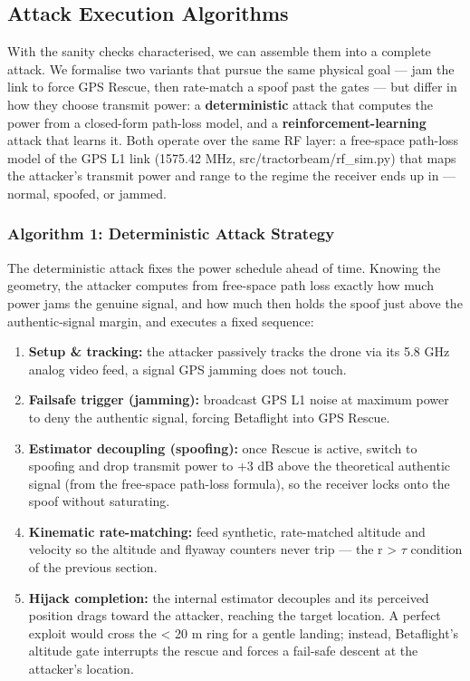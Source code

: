 \documentclass[11pt]{article}
\begin{document}
\subsection*{Attack Execution Algorithms}
With the sanity checks characterised, we can assemble them into a complete attack. We formalise two variants that pursue the same physical goal — jam the link to force GPS Rescue, then rate-match a spoof past the gates — but differ in how they choose transmit power: a \textbf{deterministic} attack that computes the power from a closed-form path-loss model, and a \textbf{reinforcement-learning} attack that learns it. Both operate over the same RF layer: a free-space path-loss model of the GPS L1 link (1575.42 MHz, src/tractorbeam/rf\_\allowbreak{}sim.py) that maps the attacker's transmit power and range to the regime the receiver ends up in — normal, spoofed, or jammed.

\subsubsection*{Algorithm 1: Deterministic Attack Strategy}
The deterministic attack fixes the power schedule ahead of time. Knowing the geometry, the attacker computes from free-space path loss exactly how much power jams the genuine signal, and how much then holds the spoof just above the authentic-signal margin, and executes a fixed sequence:
\begin{enumerate}
\item \textbf{Setup \& tracking:} the attacker passively tracks the drone via its 5.8 GHz analog video feed, a signal GPS jamming does not touch.
\item \textbf{Failsafe trigger (jamming):} broadcast GPS L1 noise at maximum power to deny the authentic signal, forcing Betaflight into GPS Rescue.
\item \textbf{Estimator decoupling (spoofing):} once Rescue is active, switch to spoofing and drop transmit power to +3 dB above the theoretical authentic signal (from the free-space path-loss formula), so the receiver locks onto the spoof without saturating.
\item \textbf{Kinematic rate-matching:} feed synthetic, rate-matched altitude and velocity so the altitude and flyaway counters never trip — the r > $\tau$ condition of the previous section.
\item \textbf{Hijack completion:} the internal estimator decouples and its perceived position drags toward the attacker, reaching the target location. A perfect exploit would cross the < 20 m ring for a gentle landing; instead, Betaflight's altitude gate interrupts the rescue and forces a fail-safe descent at the attacker's location.
\end{enumerate}
\end{document}
